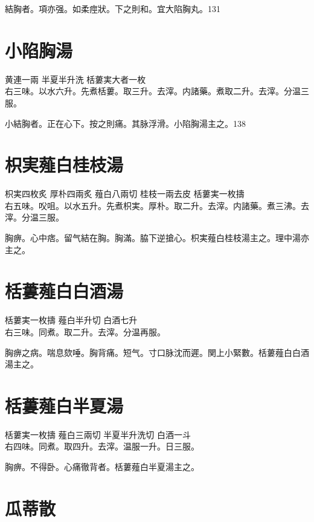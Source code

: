結胸者。項亦强。如柔痙狀。下之則和。宜大陷胸丸。131

\section{小陷胸湯}

黄連{\scriptsize 一兩} 半夏{\scriptsize 半升洗} 栝蔞実{\scriptsize 大者一枚}\\
右三味。以水六升。先煮栝蔞。取三升。去滓。内諸藥。煮取二升。去滓。分温三服。

小結胸者。正在心下。按之則痛。其脉浮滑。小陷胸湯主之。138

\section{枳実薤白桂枝湯}

枳実{\scriptsize 四枚炙} 厚朴{\scriptsize 四兩炙} 薤白{\scriptsize 八兩切} 桂枝{\scriptsize 一兩去皮} 栝蔞実{\scriptsize 一枚擣}\\
右五味。㕮咀。以水五升。先煮枳実。厚朴。取二升。去滓。内諸藥。煮三沸。去滓。分温三服。

胸痹。心中痞。留气結在胸。胸滿。脇下逆搶心。枳実薤白桂枝湯主之。理中湯亦主之。

\section{栝蔞薤白白酒湯}

栝蔞実{\scriptsize 一枚擣} 薤白{\scriptsize 半升切} 白酒{\scriptsize 七升}\\
右三味。同煮。取二升。去滓。分温再服。

胸痹之病。喘息欬唾。胸背痛。短气。寸口脉沈而遲。関上小緊數。栝蔞薤白白酒湯主之。

\section{栝蔞薤白半夏湯}

栝蔞実{\scriptsize 一枚擣} 薤白{\scriptsize 三兩切} 半夏{\scriptsize 半升洗切} 白酒{\scriptsize 一斗}\\
右四味。同煮。取四升。去滓。温服一升。日三服。

胸痹。不得卧。心痛徹背者。栝蔞薤白半夏湯主之。

\section{瓜蒂散}

